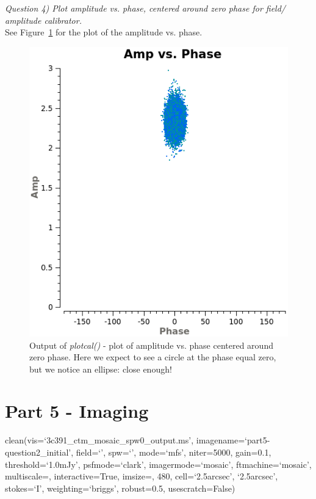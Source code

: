 \documentclass[12pt, a4paper]{article}
\begin{document}
\noindent \textit{Question 4) Plot amplitude vs. phase, centered around zero phase for field/ amplitude calibrator.} \\
See Figure~\ref{fig:part4subH-ellips} for the plot of the amplitude vs. phase. 
\begin{figure}[h!]
    \centering
    \includegraphics[scale=0.5]{../Imaging/plots/part4-subH-question4_fld1-corrected-ampvsphase.png}
    \caption{Output of \emph{plotcal()} - plot of amplitude vs. phase centered around zero phase. Here we expect to see a circle at the phase equal zero, but we notice an ellipse: close enough! \label{fig:part4subH-ellips}}
\end{figure}

\section{Part 5 - Imaging}
{\tiny clean(vis=`3c391\_ctm\_mosaic\_spw0\_output.ms', imagename=`part5-question2\_initial', field=`', spw=`', mode=`mfs', niter=5000, gain=0.1, threshold=`1.0mJy', psfmode=`clark', imagermode=`mosaic', ftmachine=`mosaic', multiscale=\rbrack, interactive=True, imsize=, 480\rbrack, cell=\lbrack `2.5arcsec', `2.5arcsec'\rbrack, stokes=`I', weighting=`briggs', robust=0.5, usescratch=False) }
\end{document}
